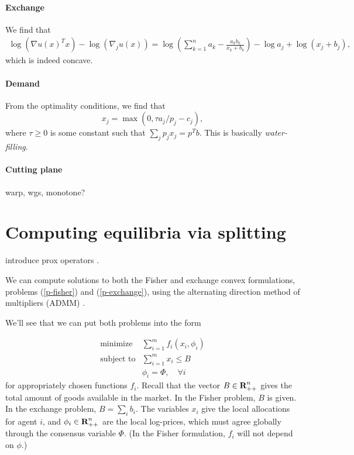 \documentclass[12pt]{article}
\begin{document}
\paragraph{Exchange}
We find that 
\begin{align*}
\log(\nabla u(x)^T x) - \log(\nabla_j u(x)) =
\log\left(\sum_{k=1}^n a_k - \frac{a_k b_k}{x_k+b_k} \right) - \log a_j + \log (x_j + b_j),
\end{align*}
which is indeed concave.

\paragraph{Demand}
From the optimality conditions, we find that
\[
x_j = \max(0, \tau a_j/p_j - c_j),
\]
where $\tau \geq 0$ is some constant such that $\sum_j p_j x_j = p^Tb$.
This is basically \emph{water-filling}.

\paragraph{Cutting plane}
warp, wgs, monotone?


\section{Computing equilibria via splitting}
introduce prox operators \cite{parikh2013proximal, boyd2011distributed}.

We can compute solutions to both the Fisher and exchange convex
formulations, problems (\ref{p-fisher}) and (\ref{p-exchange}), using
the alternating direction method of multipliers (ADMM) \cite{boyd2011distributed}.

We'll see that we can put both problems into the form

\begin{equation}
\label{p-admm}
\begin{array}{ll}
\mbox{minimize} & \sum_{i=1}^m f_i(x_i, \phi_i) \\
\mbox{subject to} & \sum_{i=1}^m x_i \leq B\\
& \phi_i = \Phi, \quad \forall i
\end{array}
\end{equation}
for appropriately chosen functions $f_i$.
Recall that the vector $B \in {\mbox{\bf R}}^n_{++}$ gives the total
amount of goods available in the market. In the Fisher problem,
$B$ is given.
In the exchange problem, $B = \sum_i b_i$.
The variables $x_i$ give the local allocations for agent $i$, and
$\phi_i \in {\mbox{\bf R}}^n_{++}$
are the local log-prices, which must agree globally through the
consensus variable $\Phi$.
(In the Fisher formulation, $f_i$ will not depend on $\phi$.)
\end{document}
